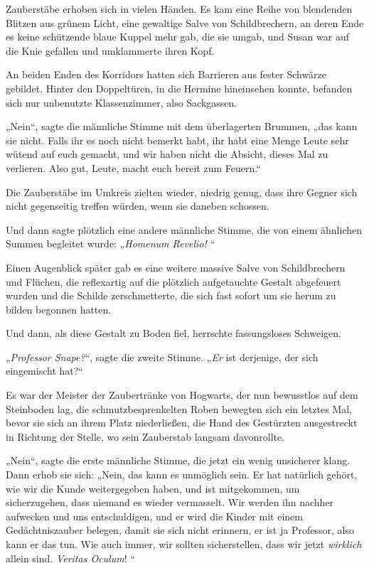 {Zauberstäbe erhoben sich in vielen Händen. Es kam eine Reihe von blendenden Blitzen aus grünem Licht, eine gewaltige Salve von Schildbrechern, an deren Ende es keine schützende blaue Kuppel mehr gab, die sie umgab, und Susan war auf die Knie gefallen und umklammerte ihren Kopf.

An beiden Enden des Korridors hatten sich Barrieren aus fester Schwärze gebildet. Hinter den Doppeltüren, in die Hermine hineinsehen konnte, befanden sich nur unbenutzte Klassenzimmer, also Sackgassen.

„Nein“, sagte die männliche Stimme mit dem überlagerten Brummen, „das kann sie nicht. Falls ihr es noch nicht bemerkt habt, ihr habt eine Menge Leute sehr wütend auf euch gemacht, und wir haben nicht die Absicht, dieses Mal zu verlieren. Also gut, Leute, macht euch bereit zum Feuern.“

Die Zauberstäbe im Umkreis zielten wieder, niedrig genug, dass ihre Gegner sich nicht gegenseitig treffen würden, wenn sie daneben schossen.

Und dann sagte plötzlich eine andere männliche Stimme, die von einem ähnlichen Summen begleitet wurde: „\emph{Homenum Revelio!} “

Einen Augenblick später gab es eine weitere massive Salve von Schildbrechern und Flüchen, die reflexartig auf die plötzlich aufgetauchte Gestalt abgefeuert wurden und die Schilde zerschmetterte, die sich fast sofort um sie herum zu bilden begonnen hatten.

Und dann, als diese Gestalt zu Boden fiel, herrschte fassungsloses Schweigen.

„\emph{Professor Snape?}“, sagte die zweite Stimme. „\emph{Er} ist derjenige, der sich eingemischt hat?“

Es war der Meister der Zaubertränke von Hogwarts, der nun bewusstlos auf dem Steinboden lag, die schmutzbesprenkelten Roben bewegten sich ein letztes Mal, bevor sie sich an ihrem Platz niederließen, die Hand des Gestürzten ausgestreckt in Richtung der Stelle, wo sein Zauberstab langsam davonrollte.

„Nein“, sagte die erste männliche Stimme, die jetzt ein wenig unsicherer klang. Dann erhob sie sich: „Nein, das kann es unmöglich sein. Er hat natürlich gehört, wie wir die Kunde weitergegeben haben, und ist mitgekommen, um sicherzugehen, dass niemand es wieder vermasselt. Wir werden ihn nachher aufwecken und uns entschuldigen, und er wird die Kinder mit einem Gedächtniszauber belegen, damit sie sich nicht erinnern, er ist ja Professor, also kann er das tun. Wie auch immer, wir sollten sicherstellen, dass wir jetzt \emph{wirklich} allein sind. \emph{Veritas Oculum}! “

}
